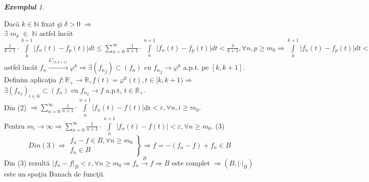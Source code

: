 \documentclass[ a4paper, 12pt]{report}
\theoremstyle{definition}
\theoremstyle{remark}
\newtheorem{exemple}{\bf Exemplul}[section]
\numberwithin{equation}{section}
\begin{document}
\begin{exemple}
\begin{enumerate}
Dac\u a $k \in \mathbb{N}$ fixat \c si $\delta>0$ $\Rightarrow$ \\ $\exists$  $m_\delta$ $\in$ $\mathbb{N}$ astfel \^inc\^ at $\frac{1}{k+1}\cdot\int\limits_{k}^{k+1}{\lvert f_n {(t)} - f_p{(t)} \rvert dt}
\leq\sum\limits_{n=0}^{\infty}\frac{1}{n+1}\cdot\int\limits_{n}^{n+1}\lvert f_n{(t)}-f_p{(t)}\rvert dt < \frac{\delta}{k+1}, \forall n,p \geq m_0 \Rightarrow \int\limits_{k}^{k+1}\lvert f_n({t})-f_p({t})\rvert dt<\delta,\forall n,p\geq m_\delta\Rightarrow(f_n)_n \in \mathcal{F}_L{^1_{[k,k+1]}} \Rightarrow \exists   \varphi^k \in L^1_{[k,k+1]}$ astfel \^inc\^ at $f_n\xrightarrow{L^1_{[k,k+1]}} \varphi^k \Rightarrow \exists ({f_n}_j)\subset (f_n)$ cu ${f_n}_j\xrightarrow{}\varphi^k$ a.p.t. pe $[k,k+1]$.\vspace{2mm}
\vspace{2mm}\\
Definim aplica\c tia $f:{\mathbb{R}}_+ \xrightarrow{}  \mathbb{R} , f(t)={ \varphi^k}(t) , t \in[k,k+1) \Rightarrow$ \\  $\exists {({f_n}_i)}_{i \in \mathbb{N}} \subset (f_n)$ cu ${f_n}_i\xrightarrow{}f$ a.p.t, $t \in \mathbb{R}_+.$\\
Din (2) $\Rightarrow \sum\limits_{n=0}^{\infty}\frac{1}{n+1}\cdot \int\limits_{n}^{n+1}\lvert f_n(t)-f(t)\rvert$dt$<\varepsilon,\forall n,i\geq m_0.$
\\Pentru $m_i\xrightarrow{}\infty\Rightarrow \sum\limits_{n=0}^{\infty}\frac{1}{n+1}\cdot \int\limits_{n}^{n+1}
\lvert f_n(t)-f(t) \rvert<\varepsilon,\forall n\geq m_0$.\hspace{18mm} (3) \\
\begin{equation*}
 Din(3) \Rightarrow
  \left.\begin{aligned}
          f_n-f\in B,\forall n\geq m_0 \\
         f_n\in B
        \end{aligned}
  \right\}
  \mbox{$\Rightarrow f=-(f_n-f)+f_n\in B$}
 \end{equation*}
Din (3) rezult\u a $\lvert f_n-f\rvert_B<\varepsilon,\forall n\geq m_0\Rightarrow f_n\xrightarrow{B}f \Rightarrow B$ este complet $\Rightarrow(B,\lvert \cdot \rvert_B)$este un spa\c tiu Banach de func\c tii.


\end{enumerate}
\end{exemple}
\end{document}
